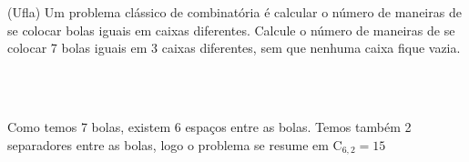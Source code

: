 \begin{ex}
 (Ufla) Um problema clássico de combinatória é calcular o número de maneiras de se colocar bolas iguais em caixas diferentes. Calcule o número de maneiras de se colocar 7 bolas iguais em 3 caixas diferentes, sem que nenhuma caixa fique vazia.
   \begin{sol}
       \phantom{A}  \\ 

     \\
     Como temos 7 bolas, existem 6 espaços entre as bolas. Temos também 2 separadores entre as bolas, logo o problema se resume em $\mathrm{C}_{6,2}=15$
   \end{sol}
\end{ex}